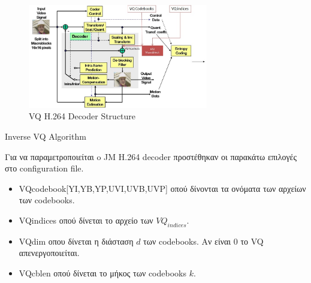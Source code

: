 \begin{figure}[H]
  \centering
  \includegraphics[width=0.7\textwidth]{chapter5/vqdecoder.jpg}
  \caption{VQ H.264 Decoder Structure}
  \label{fig:vqdecoder}
\end{figure}

\begin{algorithm}[H]
\begin{algorithmic}[1]
\EndFor
\EndFunction
\end{algorithmic}
\caption{Inverse VQ Algorithm}
\label{alg:iquantmb}
\end{algorithm}

\indent Για να παραμετροποιείται o JM Η.264 decoder προστέθηκαν οι παρακάτω επιλογές στο configuration file.

\begin{itemize}
    \item VQcodebook[YI,YB,YP,UVI,UVB,UVP] οπού δίνονται τα ονόματα των αρχείων των codebooks.
    \item VQindices οπού δίνεται το αρχείο των $VQ_{indices}$.
    \item VQdim οπου δίνεται η διάσταση $d$ των codebooks. Αν είναι 0 το VQ απενεργοποιείται.
    \item VQcblen οπού δίνεται το μήκος των codebooks $k$.
\end{itemize}